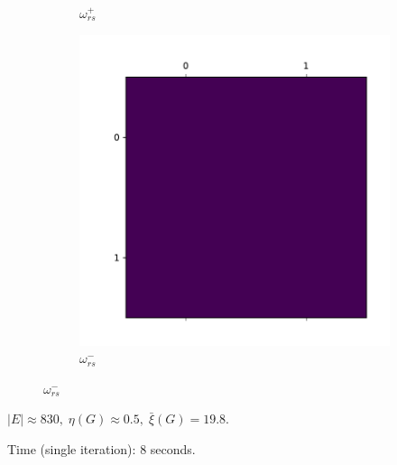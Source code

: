 \documentclass{beamer}
\begin{document}
\begin{frame}[c]
\begin{figure}
\begin{center}
\begin{subfigure}[b]{0.3\textwidth}
				\caption{$\omega ^{+} _{rs} $}
				\label{fig:out/synthetic/omega_positive3.pdf}
			\end{subfigure}
			\begin{subfigure}[b]{0.3\textwidth}
				\centering
				\includegraphics[width=\textwidth]{out/synthetic/omega_negative3.pdf}
				\caption{$\omega ^{-} _{rs} $}
				\label{fig:}
			\end{subfigure}
		\end{center}
	\end{figure}

	$|E| \approx 830, \; \eta(G) \approx 0.5, \; \bar{\xi}(G) = 19.8$.

	Time (single iteration): $8$ seconds.
\end{frame}
\end{document}

